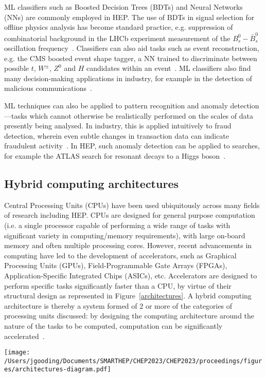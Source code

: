 ML classifiers such as Boosted Decision Trees (BDTs) and Neural Networks (NNs) are commonly employed in HEP. The use of BDTs in signal selection for offline physics analysis has become standard practice, e.g. suppression of combinatorial background in the LHCb experiment measurement of the $B_s^0-\bar{B}_s^0$ oscillation frequency~\cite{delta-ms}. Classifiers can also aid tasks such as event reconstruction, e.g. the CMS boosted event shape tagger, a NN trained to discriminate between possible $t$, $W^\pm$, $Z^0$ and $H$ candidates within an event~\cite{CMS-best}. ML classifiers also find many decision-making applications in industry, for example in the detection of malicious communications~\cite{classifier-phishing}.

ML techniques can also be applied to pattern recognition and anomaly detection—tasks which cannot otherwise be realistically performed on the scales of data presently being analysed. In industry, this is applied intuitively to fraud detection, wherein even subtle changes in transaction  data can indicate fraudulent activity~\cite{fraud-detection}. In HEP, such anomaly detection can be applied to searches, for example the ATLAS search for resonant decays to a Higgs boson~\cite{anomaly-hep}.

\subsection{Hybrid computing architectures}
\label{hybrid-architectures}
Central Processing Units (CPUs) have been used ubiquitously across many fields of research including HEP. CPUs are designed for general purpose computation (i.e. a single processor capable of performing a wide range of tasks with significant variety in computing/memory requirements), with large on-board memory and often multiple processing cores. However, recent advancements in computing have led to the development of accelerators, such as Graphical Processing Units (GPUs), Field-Programmable Gate Arrays (FPGAs), Application-Specific Integrated Chips (ASICs), etc. Accelerators are designed to perform specific tasks significantly faster than a CPU, by virtue of their structural design as represented in Figure~\ref{architectures}. A hybrid computing architecture is thereby a system formed of $2$ or more of the categories of processing units discussed: by designing the computing architecture around the nature of the tasks to be computed, computation can be significantly accelerated~\cite{architectures}.

\begin{figure*}[h!]
    \centering
    \texttt{[image: /Users/jgooding/Documents/SMARTHEP/CHEP2023/CHEP2023/proceedings/figures/architectures-diagram.pdf]}
    \caption{Comparison of CPU, GPU and FPGA architectures, illustrated as schematic diagrams. GPUs typically contain a greater proportion of computational resources than CPUs, with these resources subdivided within each multiprocessor to provide better parallel computing performance. FPGAs take a different approach, comprising many control blocks connected to memory/IO interface and to one another via switches~\cite{architectures}.}
    \label{architectures}
\end{figure*}

